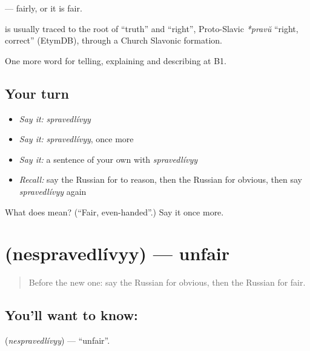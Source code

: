 \emph{} — fairly, or it is fair.

\begin{cousinweb}
\textbf{} is usually traced to the root of \emph{} \textquotedblleft{}truth\textquotedblright{} and \emph{} \textquotedblleft{}right\textquotedblright{}, Proto-Slavic \emph{*pravŭ} \textquotedblleft{}right, correct\textquotedblright{} (EtymDB), through a Church Slavonic formation.
\end{cousinweb}

\begin{grammarlens}[title={What you've built}]
One more word for telling, explaining and describing at B1.
\end{grammarlens}

\subsection*{Your turn}
\begin{itemize}
\raggedright
  \item \emph{Say it:} \emph{spravedlívyy}
  \item \emph{Say it:} \emph{spravedlívyy}, once more
  \item \emph{Say it:} a sentence of your own with \emph{spravedlívyy}
  \item \emph{Recall:} say the Russian for to reason, then the Russian for obvious, then say \emph{spravedlívyy} again
\end{itemize}

\begin{tcolorbox}[breakable,colback=teal!4,colframe=teal!35!black,title={Before you move on}]
What does  mean? (\textquotedblleft{}Fair, even-handed\textquotedblright{}.) Say it once more.
\end{tcolorbox}
\section[\texorpdfstring{\ru{несправедливый} (nespravedlívyy)}{несправедливый (nespravedlívyy)}]{ (nespravedlívyy) — unfair}

\label{lesson:RU-C345-nespravedlivyy}



\begin{quote}
Before the new one: say the Russian for obvious, then the Russian for fair.
\end{quote}

\subsection*{You'll want to know: }
\textbf{} (\emph{nespravedlívyy}) — \textquotedblleft{}unfair\textquotedblright{}.

